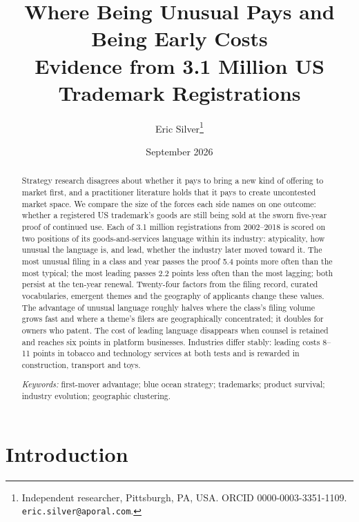 
\usepackage{longtable}
\usepackage{array}
\usepackage{placeins}
\graphicspath{{../../}}
\makeatletter{}\makeatother
\title{\bfseries Where Being Unusual Pays and Being Early Costs\\
\large Evidence from 3.1 Million US Trademark Registrations}
\author{Eric Silver\thanks{Independent researcher, Pittsburgh, PA, USA.
ORCID 0000-0003-3351-1109. \texttt{eric.silver@aporal.com}.}}
\date{September 2026}


\maketitle
\begin{abstract}
\noindent Strategy research disagrees about whether it pays to bring a new
kind of offering to market first, and a practitioner literature holds
that it pays to create uncontested market space. We compare the size of
the forces each side names on one outcome: whether a registered US
trademark's goods are still being sold at the sworn five-year proof of
continued use. Each of 3.1 million registrations from 2002--2018 is
scored on two positions of its goods-and-services language within its
industry: atypicality, how unusual the language is, and lead, whether
the industry later moved toward it. The most unusual filing in a class
and year passes the proof 5.4 points more often than the most typical;
the most leading passes 2.2 points less often than the most lagging;
both persist at the ten-year renewal. Twenty-four factors from the
filing record, curated vocabularies, emergent themes and the geography
of applicants change these values. The advantage of unusual language
roughly halves where the class's filing volume grows fast and where a
theme's filers are geographically concentrated; it doubles for owners
who patent. The cost of leading language disappears when counsel is
retained and reaches six points in platform businesses. Industries
differ stably: leading costs 8--11 points in tobacco and technology
services at both tests and is rewarded in construction, transport and
toys.

\medskip
\noindent\emph{Keywords:} first-mover advantage; blue ocean strategy;
trademarks; product survival; industry evolution; geographic clustering.
\end{abstract}

\section{Introduction}\label{sec:intro}


